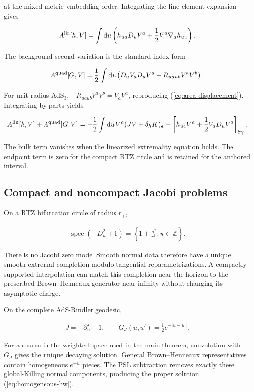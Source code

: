 at the mixed metric--embedding order. Integrating the line-element expansion gives

\begin{align}
A^{\rm lin}[h,V]
=\int\mathrm du
\left(h_{ua}D_uV^a+\frac12V^a\nabla_a h_{uu}\right).
\end{align}

The background second variation is the standard index form

\begin{align}
A^{\rm quad}[G,V]
=\frac12\int\mathrm du
\left(D_uV_aD_uV^a-R_{uau b}V^aV^b\right).
\end{align}

For unit-radius AdS$_3$, $-R_{uau b}V^aV^b=V_aV^a$, reproducing (\ref{eq:area-displacement}). Integrating by parts yields

\begin{align}
A^{\rm lin}[h,V]+A^{\rm quad}[G,V]
=-\frac12\int\mathrm du\,V^a
(JV+\delta_hK)_a
+\left[h_{ua}V^a+\frac12V_aD_uV^a\right]_{\partial\gamma}.
\end{align}

The bulk term vanishes when the linearized extremality equation holds. The endpoint term is zero for the compact BTZ circle and is retained for the anchored interval.

\subsection{Compact and noncompact Jacobi problems}

On a BTZ bifurcation circle of radius $r_+$,

\begin{align}
\operatorname{spec}(-D_u^2+1)
=\left\{1+\frac{n^2}{r_+^2}:n\in\mathbb Z\right\}.
\end{align}

There is no Jacobi zero mode. Smooth normal data therefore have a unique smooth extremal completion modulo tangential reparametrizations. A compactly supported interpolation can match this completion near the horizon to the prescribed Brown--Henneaux generator near infinity without changing its asymptotic charge.

On the complete AdS-Rindler geodesic,

\begin{align}
J=-\partial_u^2+1,
\qquad
G_J(u,u')=\frac12e^{-|u-u'|}.
\end{align}

For a source in the weighted space used in the main theorem, convolution with $G_J$ gives the unique decaying solution. General Brown--Henneaux representatives contain homogeneous $e^{\pm u}$ pieces. The PSL subtraction removes exactly these global-Killing normal components, producing the proper solution (\ref{eq:homogeneous-hw}).

